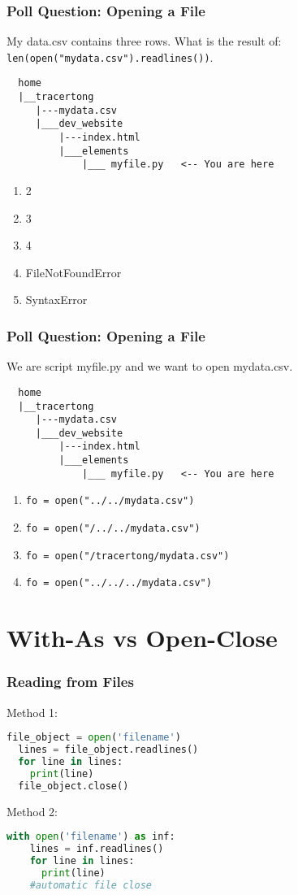 \documentclass{beamer}
\begin{document}
%
%
\begin{frame}[fragile]
  \frametitle{Poll Question: Opening a File}
  My data.csv contains three rows. What is the result of: \lstinline|len(open("mydata.csv").readlines())|.
  \begin{lstlisting}
  home
  |__tracertong
     |---mydata.csv
     |___dev_website
         |---index.html
         |___elements
             |___ myfile.py   <-- You are here
  \end{lstlisting} 
  \vfill
  \begin{enumerate}[A]
    \item 2
    \item 3
    \item 4
    \item FileNotFoundError
    \item SyntaxError
  \end{enumerate}
\end{frame}

%
%
\begin{frame}[fragile]
  \frametitle{Poll Question: Opening a File}
  We are script myfile.py and we want to open mydata.csv.
  \begin{lstlisting}
  home
  |__tracertong
     |---mydata.csv
     |___dev_website
         |---index.html
         |___elements
             |___ myfile.py   <-- You are here
  \end{lstlisting} 
  \vfill
  \begin{enumerate}[A]
    \item \lstinline|fo = open("../../mydata.csv")|
    \item \lstinline|fo = open("/../../mydata.csv")|
    \item \lstinline|fo = open("/tracertong/mydata.csv")|
    \item \lstinline|fo = open("../../../mydata.csv")|
  \end{enumerate}
\end{frame}



\section{With-As vs Open-Close}
%
%
\begin{frame}[fragile]
  \frametitle{Reading from Files}
  Method 1:
  \begin{lstlisting}[language=Python, autogobble]
  file_object = open('filename')
  lines = file_object.readlines()
  for line in lines:
    print(line)
  file_object.close()
  \end{lstlisting}
  \vfill
  Method 2:
  \begin{lstlisting}[language=Python, autogobble]
  with open('filename') as inf:
    lines = inf.readlines()
    for line in lines:
      print(line)
    #automatic file close
  \end{lstlisting}
\end{frame}
\end{document}
